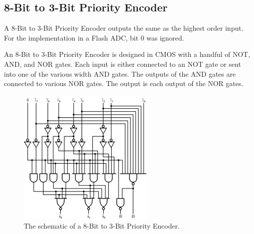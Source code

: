 \documentclass[conference]{IEEEtran}
\begin{document}
\subsection{8-Bit to 3-Bit Priority Encoder}

A 8-Bit to 3-Bit Priority Encoder outputs the same as the highest order input. For the implementation in a Flash ADC, bit 0 was ignored.

An 8-Bit to 3-Bit Priority Encoder is designed in CMOS with a handful of NOT, AND, and NOR gates. Each input is either connected to an NOT gate or sent into one of the various width AND gates. The outputs of the AND gates are connected to various NOR gates. The output is each output of the NOR gates.

\begin{figure}[htbp]
\centerline{\includegraphics{PESch.png}}
\caption{The schematic of a 8-Bit to 3-Bit Priority Encoder.}
\end{figure}
\end{document}
